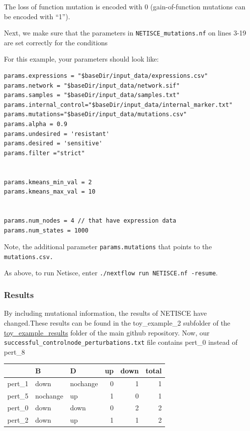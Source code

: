 \documentclass[
]{book}
\begin{document}
The loss of function mutation is encoded with 0 (gain-of-function mutations can be encoded with ``1'').

Next, we make sure that the parameters in \texttt{NETISCE\_mutations.nf} on lines 3-19 are set correctly for the conditions

For this example, your parameters should look like:

\begin{verbatim}
params.expressions = "$baseDir/input_data/expressions.csv"
params.network = "$baseDir/input_data/network.sif"
params.samples = "$baseDir/input_data/samples.txt"
params.internal_control="$baseDir/input_data/internal_marker.txt"
params.mutations="$baseDir/input_data/mutations.csv"
params.alpha = 0.9
params.undesired = 'resistant'
params.desired = 'sensitive'
params.filter ="strict"


params.kmeans_min_val = 2
params.kmeans_max_val = 10


params.num_nodes = 4 // that have expression data
params.num_states = 1000
\end{verbatim}

Note, the additional parameter \texttt{params.mutations} that points to the \texttt{mutations.csv.}

As above, to run Netisce, enter \texttt{./nextflow\ run\ NETISCE.nf\ -resume}.

\hypertarget{section-id}{%
\subsubsection*{Results}\label{section-id}}

By including mutational information, the results of NETISCE have changed.These results can be found in the toy\_example\_2 subfolder of the \href{https://github.com/VeraLiconaResearchGroup/Netisce/tree/main/toy_example_results}{toy\_example\_results} folder of the main github repository.
Now, our \texttt{successful\_controlnode\_perturbations.txt} file contains pert\_0 instead of pert\_8

\begin{tabular}{l|l|l|r|r|r}
\hline
  & B & D & up & down & total\\
\hline
pert\_1 & down & nochange & 0 & 1 & 1\\
\hline
pert\_5 & nochange & up & 1 & 0 & 1\\
\hline
pert\_0 & down & down & 0 & 2 & 2\\
\hline
pert\_2 & down & up & 1 & 1 & 2\\
\hline
\end{tabular}
\end{document}
